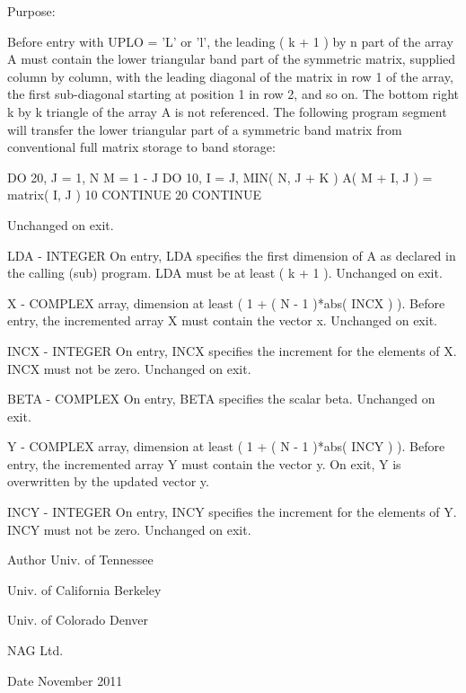 \begin{DoxyParagraph}{Purpose\+: }
\begin{DoxyVerb}
           Before entry with UPLO = 'L' or 'l', the leading ( k + 1 )
           by n part of the array A must contain the lower triangular
           band part of the symmetric matrix, supplied column by
           column, with the leading diagonal of the matrix in row 1 of
           the array, the first sub-diagonal starting at position 1 in
           row 2, and so on. The bottom right k by k triangle of the
           array A is not referenced.
           The following program segment will transfer the lower
           triangular part of a symmetric band matrix from conventional
           full matrix storage to band storage:

                 DO 20, J = 1, N
                    M = 1 - J
                    DO 10, I = J, MIN( N, J + K )
                       A( M + I, J ) = matrix( I, J )
              10    CONTINUE
              20 CONTINUE

           Unchanged on exit.

  LDA    - INTEGER
           On entry, LDA specifies the first dimension of A as declared
           in the calling (sub) program. LDA must be at least
           ( k + 1 ).
           Unchanged on exit.

  X      - COMPLEX array, dimension at least
           ( 1 + ( N - 1 )*abs( INCX ) ).
           Before entry, the incremented array X must contain the
           vector x.
           Unchanged on exit.

  INCX   - INTEGER
           On entry, INCX specifies the increment for the elements of
           X. INCX must not be zero.
           Unchanged on exit.

  BETA   - COMPLEX
           On entry, BETA specifies the scalar beta.
           Unchanged on exit.

  Y      - COMPLEX array, dimension at least
           ( 1 + ( N - 1 )*abs( INCY ) ).
           Before entry, the incremented array Y must contain the
           vector y. On exit, Y is overwritten by the updated vector y.

  INCY   - INTEGER
           On entry, INCY specifies the increment for the elements of
           Y. INCY must not be zero.
           Unchanged on exit.\end{DoxyVerb}
 
\end{DoxyParagraph}
\begin{DoxyAuthor}{Author}
Univ. of Tennessee 

Univ. of California Berkeley 

Univ. of Colorado Denver 

N\+A\+G Ltd. 
\end{DoxyAuthor}
\begin{DoxyDate}{Date}
November 2011 
\end{DoxyDate}
\hypertarget{group__complex__lin_ga99144e08160bc01893ddea6649e90381}{}
